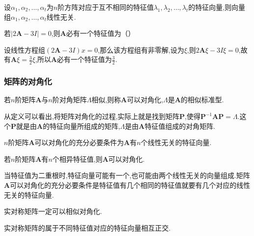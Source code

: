 \begin{ttheorem}
    设$\alpha_1,\alpha_2,\dots,\alpha_t$为$n$阶方阵对应于互不相同的特征值$\lambda_1,\lambda_2,\dots,\lambda_t$的特征向量,则向量组$\alpha_1,\alpha_2,\dots,\alpha_t$线性无关.
\end{ttheorem}


\begin{examp}{若$\vert 2\mathbf{A}-3I\vert =0$,则$\mathbf{A}$必有一个特征值为（\quad）}

    \jie 
    设线性方程组$(2\mathbf{A}-3I)x=0$,那么该方程组有非零解,设为$\xi$,则$2\mathbf{A} \xi -3I \xi =0$,故有$\mathbf{A} \xi =\frac{3}{2}\xi$,所以$\mathbf{A}$必有一个特征值为$\frac{3}{2}$.
\end{examp}

\subsubsection{矩阵的对角化}

\begin{definition}
    若$n$阶矩阵$\mathbf{A}$与$n$阶对角矩阵$\varLambda$相似,则称$\mathbf{A}$可以对角化,$\varLambda $是$\mathbf{A}$的相似标准型.
\end{definition}

从定义可以看出,将矩阵对角化的过程,实际上就是找到矩阵$\mathbf{P}$,使得$\mathbf{P}^{-1}\mathbf{A}\mathbf{P}=\varLambda$.这个$\mathbf{P}$就是由$\mathbf{A}$的特征向量所组成的矩阵,$\varLambda $是由$\mathbf{A}$特征值组成的对角矩阵.

\begin{ttheorem}
    $n$阶矩阵$\mathbf{A}$可以对角化的充分必要条件为$\mathbf{A}$有$n$个线性无关的特征向量.
\end{ttheorem}

\begin{ttheorem}
    若$n$阶矩阵$\mathbf{A}$有$n$个相异特征值,则$\mathbf{A}$可以对角化.
\end{ttheorem}

当特征值为二重根时,特征向量可能有一个,也可能由两个线性无关的向量组成.矩阵$\mathbf{A}$可以对角化的充分必要条件是特征值有几个相同的特征值就要有几个对应的线性无关的特征向量.

\begin{ttheorem}
    实对称矩阵一定可以相似对角化.
\end{ttheorem}

\begin{ttheorem}
    实对称矩阵的属于不同特征值对应的特征向量相互正交.
\end{ttheorem}

